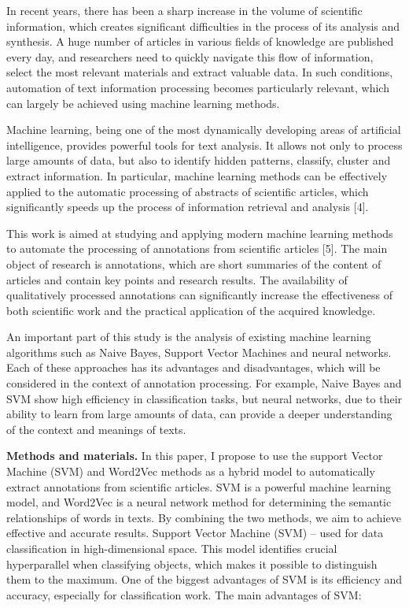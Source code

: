 \begin{multicols}{2}
In recent years, there has been a sharp increase in the volume of
scientific information, which creates significant difficulties in the
process of its analysis and synthesis. A huge number of articles in
various fields of knowledge are published every day, and researchers
need to quickly navigate this flow of information, select the most
relevant materials and extract valuable data. In such conditions,
automation of text information processing becomes particularly relevant,
which can largely be achieved using machine learning methods.

Machine learning, being one of the most dynamically developing areas of
artificial intelligence, provides powerful tools for text analysis. It
allows not only to process large amounts of data, but also to identify
hidden patterns, classify, cluster and extract information. In
particular, machine learning methods can be effectively applied to the
automatic processing of abstracts of scientific articles, which
significantly speeds up the process of information retrieval and
analysis {[}4{]}.

This work is aimed at studying and applying modern machine learning
methods to automate the processing of annotations from scientific
articles {[}5{]}. The main object of research is annotations, which are
short summaries of the content of articles and contain key points and
research results. The availability of qualitatively processed
annotations can significantly increase the effectiveness of both
scientific work and the practical application of the acquired knowledge.

An important part of this study is the analysis of existing machine
learning algorithms such as Naive Bayes, Support Vector Machines and
neural networks. Each of these approaches has its advantages and
disadvantages, which will be considered in the context of annotation
processing. For example, Naive Bayes and SVM show high efficiency in
classification tasks, but neural networks, due to their ability to learn
from large amounts of data, can provide a deeper understanding of the
context and meanings of texts.

{\bfseries Methods and materials.} In this paper, I propose to use the
support Vector Machine (SVM) and Word2Vec methods as a hybrid model to
automatically extract annotations from scientific articles. SVM is a
powerful machine learning model, and Word2Vec is a neural network method
for determining the semantic relationships of words in texts. By
combining the two methods, we aim to achieve effective and accurate
results. Support Vector Machine (SVM) -- used for data classification in
high-dimensional space. This model identifies crucial hyperparallel when
classifying objects, which makes it possible to distinguish them to the
maximum. One of the biggest advantages of SVM is its efficiency and
accuracy, especially for classification work. The main advantages of
SVM:


\end{multicols}
